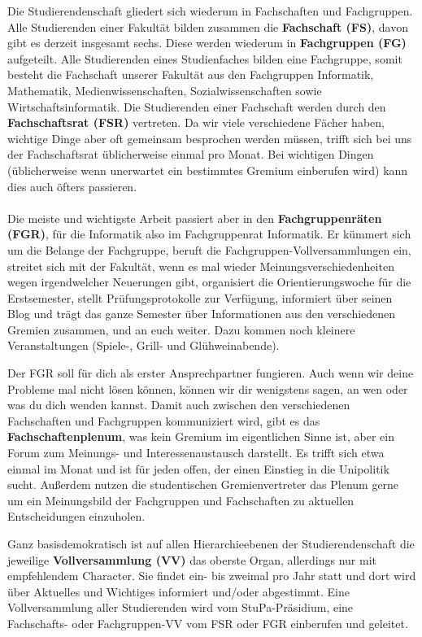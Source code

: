 Die Studierendenschaft gliedert sich wiederum in Fachschaften und Fachgruppen.
Alle Studierenden einer Fakultät bilden zusammen die \textbf{Fachschaft (FS)}, davon gibt es derzeit insgesamt sechs.
Diese werden wiederum in  \textbf{Fachgruppen (FG)} aufgeteilt. Alle Studierenden eines Studienfaches bilden eine Fachgruppe, 
somit besteht die Fachschaft unserer Fakultät aus den Fachgruppen Informatik, Mathematik, Medienwissenschaften, Sozialwissenschaften sowie 
Wirtschaftsinformatik. Die Studierenden einer Fachschaft werden  durch den 
\textbf{Fachschaftsrat (FSR)} vertreten. Da wir viele verschiedene Fächer haben, wichtige Dinge aber oft gemeinsam besprochen werden müssen,
trifft sich bei uns der Fachschaftsrat üblicherweise einmal pro Monat. 
Bei wichtigen Dingen (üblicherweise wenn unerwartet ein bestimmtes Gremium einberufen wird) kann dies auch öfters passieren.
\\
\\
Die meiste und wichtigste Arbeit passiert aber in den \textbf{Fachgruppenräten (FGR)}, für die Informatik also im Fachgruppenrat Informatik. Er kümmert sich um die Belange der Fachgruppe, beruft die Fachgruppen-Vollversammlungen ein, streitet sich mit der
Fakultät, wenn es mal wieder Meinungsverschiedenheiten wegen irgendwelcher Neuerungen gibt, organisiert die Orientierungswoche für die Erstsemester, stellt Prüfungsprotokolle zur Verfügung, informiert über seinen Blog \fginfoUrl und trägt das ganze Semester über Informationen aus den verschiedenen Gremien zusammen, und an euch weiter.
Dazu kommen noch kleinere Veranstaltungen (Spiele-, Grill- und Glühweinabende).

Der FGR soll für dich als erster Ansprechpartner fungieren. Auch wenn wir deine Probleme mal nicht lösen können, können wir dir wenigstens sagen, an wen oder was du dich wenden
kannst. Damit auch zwischen den verschiedenen Fachschaften und Fachgruppen kommuniziert wird, gibt es das \textbf{Fachschaftenplenum}, was kein Gremium im eigentlichen Sinne ist, aber ein Forum zum Meinungs- und Interessenaustausch darstellt. Es trifft sich etwa einmal im Monat und ist für jeden offen, der einen Einstieg in die Unipolitik sucht. Außerdem nutzen die studentischen Gremienvertreter das Plenum gerne um ein Meinungsbild der Fachgruppen und Fachschaften zu aktuellen Entscheidungen einzuholen.

Ganz basisdemokratisch ist auf allen Hierarchie\-ebenen der Studierendenschaft
die jeweilige \textbf{Vollversammlung (VV)} das oberste Organ, allerdings nur
mit empfehlendem Character. Sie findet ein- bis zweimal pro Jahr statt und
dort wird über Aktuelles und Wichtiges informiert und/oder abgestimmt. Eine
Vollversammlung aller Studierenden wird vom StuPa-Präsidium, eine 
Fachschafts- oder Fachgruppen-VV vom FSR oder FGR einberufen und geleitet.

